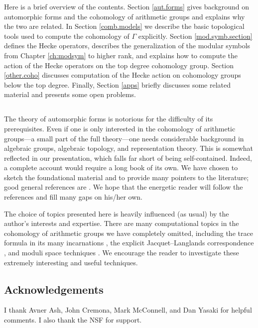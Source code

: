 Here is a brief overview of the contents.  Section \ref{aut.forms}
gives background on automorphic forms and the cohomology of arithmetic
groups and explains why the two are related.  In Section
\ref{comb.models} we describe the basic topological tools used to
compute the cohomology of $\Gamma$ explicitly.  Section
\ref{mod.symb.section} defines the Hecke operators, describes the
generalization of the modular symbols from Chapter \ref{ch:modsym} to
higher rank, and explains how to compute the action of the Hecke
operators on the top degree cohomology group.  Section
\ref{other.coho} discusses computation of the Hecke action on
cohomology groups below the top degree.  Finally, Section \ref{apps}
briefly discusses some related material and presents some open
problems.

\subsection{}
%
The theory of automorphic forms is notorious for the difficulty of its
prerequisites.  Even if one is only interested in the cohomology of
arithmetic groups---a small part of the full theory---one needs
considerable background in algebraic groups, algebraic topology, and
representation theory.  This is somewhat reflected in our
presentation, which falls far short of being self-contained.  Indeed,
a complete account would require a long book of its own.  We have
chosen to sketch the foundational material and to provide many
pointers to the literature; good general references are
\cite{borel.wallach, harder.notes, schwermer.article, vogan}.  We hope
that the energetic reader will follow the references and fill many
gaps on his/her own.

The choice of topics presented here is heavily influenced (as usual)
by the author's interests and expertise.  There are many computational
topics in the cohomology of arithmetic groups we have completely
omitted, including the trace formula in its many incarnations
\cite{gross.pollack}, the explicit Jacquet--Langlands correspondence
\cite{dembele,whitehouse}, and moduli space techniques
\cite{faber-van.der.geer, van.der.geer}.  We encourage the reader to investigate
these extremely interesting and useful techniques.

\subsection{Acknowledgements}
I thank Avner Ash, John Cremona, Mark McConnell, and Dan Yasaki for helpful
comments.  I also thank the NSF for support.  

